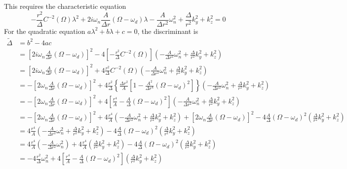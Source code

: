 \documentclass[english]{article}
\begin{document}
This requires the characteristic equation 
\[
-\frac{r^{2}}{\Delta}C^{-2}\left(\Omega\right)\lambda^{2}+2i\omega_{n}\frac{A}{\Delta r}\left(\Omega-\omega_{d}\right)\lambda-\frac{A}{\Delta r^{2}}\omega^{2}_{n}+\frac{\Delta}{r^{2}}k^{2}_{y}+k^{2}_{z}=0
\]
 For the quadratic equation $a\lambda^{2}+b\lambda+c=0$, the discriminant
is 
\begin{align*}
\tilde{\Delta} & =b^{2}-4ac\\
 & =\left[2i\omega_{n}\frac{A}{\Delta r}\left(\Omega-\omega_{d}\right)\right]^{2}-4\left[-\frac{r^{2}}{\Delta}C^{-2}\left(\Omega\right)\right]\left(-\frac{A}{\Delta r^{2}}\omega^{2}_{n}+\frac{\Delta}{r^{2}}k^{2}_{y}+k^{2}_{z}\right)\\
 & =\left[2i\omega_{n}\frac{A}{\Delta r}\left(\Omega-\omega_{d}\right)\right]^{2}+4\frac{r^{2}}{\Delta}C^{-2}\left(\Omega\right)\left(-\frac{A}{\Delta r^{2}}\omega^{2}_{n}+\frac{\Delta}{r^{2}}k^{2}_{y}+k^{2}_{z}\right)\\
 & =-\left[2\omega_{n}\frac{A}{\Delta r}\left(\Omega-\omega_{d}\right)\right]^{2}+4\frac{r^{2}}{\Delta}\left\{ \frac{\Delta r^{2}}{A}\left[1-\frac{A^{2}}{\Delta r^{4}}\left(\Omega-\omega_{d}\right)^{2}\right]\right\} \left(-\frac{A}{\Delta r^{2}}\omega^{2}_{n}+\frac{\Delta}{r^{2}}k^{2}_{y}+k^{2}_{z}\right)\\
 & =-\left[2\omega_{n}\frac{A}{\Delta r}\left(\Omega-\omega_{d}\right)\right]^{2}+4\left[\frac{r^{4}}{A}-\frac{A}{\Delta}\left(\Omega-\omega_{d}\right)^{2}\right]\left(-\frac{A}{\Delta r^{2}}\omega^{2}_{n}+\frac{\Delta}{r^{2}}k^{2}_{y}+k^{2}_{z}\right)\\
 & =-\left[2\omega_{n}\frac{A}{\Delta r}\left(\Omega-\omega_{d}\right)\right]^{2}+4\frac{r^{4}}{A}\left(-\frac{A}{\Delta r^{2}}\omega^{2}_{n}+\frac{\Delta}{r^{2}}k^{2}_{y}+k^{2}_{z}\right)+\left[2\omega_{n}\frac{A}{\Delta r}\left(\Omega-\omega_{d}\right)\right]^{2}-4\frac{A}{\Delta}\left(\Omega-\omega_{d}\right)^{2}\left(\frac{\Delta}{r^{2}}k^{2}_{y}+k^{2}_{z}\right)\\
 & =4\frac{r^{4}}{A}\left(-\frac{A}{\Delta r^{2}}\omega^{2}_{n}+\frac{\Delta}{r^{2}}k^{2}_{y}+k^{2}_{z}\right)-4\frac{A}{\Delta}\left(\Omega-\omega_{d}\right)^{2}\left(\frac{\Delta}{r^{2}}k^{2}_{y}+k^{2}_{z}\right)\\
 & =4\frac{r^{4}}{A}\left(-\frac{A}{\Delta r^{2}}\omega^{2}_{n}\right)+4\frac{r^{4}}{A}\left(\frac{\Delta}{r^{2}}k^{2}_{y}+k^{2}_{z}\right)-4\frac{A}{\Delta}\left(\Omega-\omega_{d}\right)^{2}\left(\frac{\Delta}{r^{2}}k^{2}_{y}+k^{2}_{z}\right)\\
 & =-4\frac{r^{2}}{\Delta}\omega^{2}_{n}+4\left[\frac{r^{4}}{A}-\frac{A}{\Delta}\left(\Omega-\omega_{d}\right)^{2}\right]\left(\frac{\Delta}{r^{2}}k^{2}_{y}+k^{2}_{z}\right)\\

\end{align*}
\end{document}
